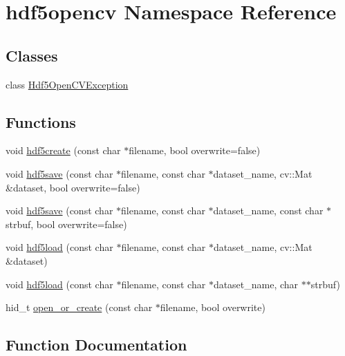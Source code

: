 \hypertarget{namespacehdf5opencv}{}\section{hdf5opencv Namespace Reference}
\label{namespacehdf5opencv}
\subsection*{Classes}
\begin{DoxyCompactItemize}
\item 
class \hyperlink{classhdf5opencv_1_1_hdf5_open_c_v_exception}{Hdf5\+Open\+C\+V\+Exception}
\end{DoxyCompactItemize}
\subsection*{Functions}
\begin{DoxyCompactItemize}
\item 
void \hyperlink{namespacehdf5opencv_a6c049c41c340cada7bec153008db21c3}{hdf5create} (const char $\ast$filename, bool overwrite=false)
\item 
void \hyperlink{namespacehdf5opencv_a0a862a59f3ed4d9f5245c753b3b2a3ee}{hdf5save} (const char $\ast$filename, const char $\ast$dataset\+\_\+name, cv\+::\+Mat \&dataset, bool overwrite=false)
\item 
void \hyperlink{namespacehdf5opencv_a77e80392bf97b70fc7a4ee1230966fa5}{hdf5save} (const char $\ast$filename, const char $\ast$dataset\+\_\+name, const char $\ast$strbuf, bool overwrite=false)
\item 
void \hyperlink{namespacehdf5opencv_abeb3b1c0af59c81e112bac07ced86d87}{hdf5load} (const char $\ast$filename, const char $\ast$dataset\+\_\+name, cv\+::\+Mat \&dataset)
\item 
void \hyperlink{namespacehdf5opencv_abe776b48aa183e84ac3d3f66c256a33b}{hdf5load} (const char $\ast$filename, const char $\ast$dataset\+\_\+name, char $\ast$$\ast$strbuf)
\item 
hid\+\_\+t \hyperlink{namespacehdf5opencv_a58f465a2f8d2c165eb9f52a85eb08820}{open\+\_\+or\+\_\+create} (const char $\ast$filename, bool overwrite)
\end{DoxyCompactItemize}


\subsection{Function Documentation}
